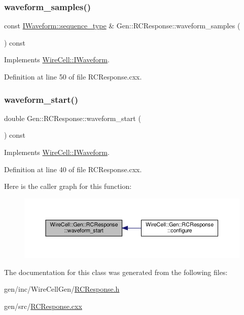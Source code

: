 \subsubsection{\texorpdfstring{waveform\+\_\+samples()}{waveform\_samples()}}
{\footnotesize\ttfamily const \hyperlink{class_wire_cell_1_1_i_waveform_ad8f85e800ab8082ddbd89ac91164db7d}{I\+Waveform\+::sequence\+\_\+type} \& Gen\+::\+R\+C\+Response\+::waveform\+\_\+samples (\begin{DoxyParamCaption}{ }\end{DoxyParamCaption}) const\hspace{0.3cm}{\ttfamily [virtual]}}



Implements \hyperlink{class_wire_cell_1_1_i_waveform_a4901f7f36170f22c3e89ebd7939be4d0}{Wire\+Cell\+::\+I\+Waveform}.



Definition at line 50 of file R\+C\+Response.\+cxx.

\mbox{\label{class_wire_cell_1_1_gen_1_1_r_c_response_acbb5822df38128bb24093caf14573766}} 
\subsubsection{\texorpdfstring{waveform\+\_\+start()}{waveform\_start()}}
{\footnotesize\ttfamily double Gen\+::\+R\+C\+Response\+::waveform\+\_\+start (\begin{DoxyParamCaption}{ }\end{DoxyParamCaption}) const\hspace{0.3cm}{\ttfamily [virtual]}}



Implements \hyperlink{class_wire_cell_1_1_i_waveform_ac7dfdf92e835bf708838bcdc1ba91ba2}{Wire\+Cell\+::\+I\+Waveform}.



Definition at line 40 of file R\+C\+Response.\+cxx.

Here is the caller graph for this function\+:
\nopagebreak
\begin{figure}[H]
\begin{center}
\leavevmode
\includegraphics[width=350pt]{class_wire_cell_1_1_gen_1_1_r_c_response_acbb5822df38128bb24093caf14573766_icgraph}
\end{center}
\end{figure}


The documentation for this class was generated from the following files\+:\begin{DoxyCompactItemize}
\item 
gen/inc/\+Wire\+Cell\+Gen/\hyperlink{_r_c_response_8h}{R\+C\+Response.\+h}\item 
gen/src/\hyperlink{_r_c_response_8cxx}{R\+C\+Response.\+cxx}\end{DoxyCompactItemize}
